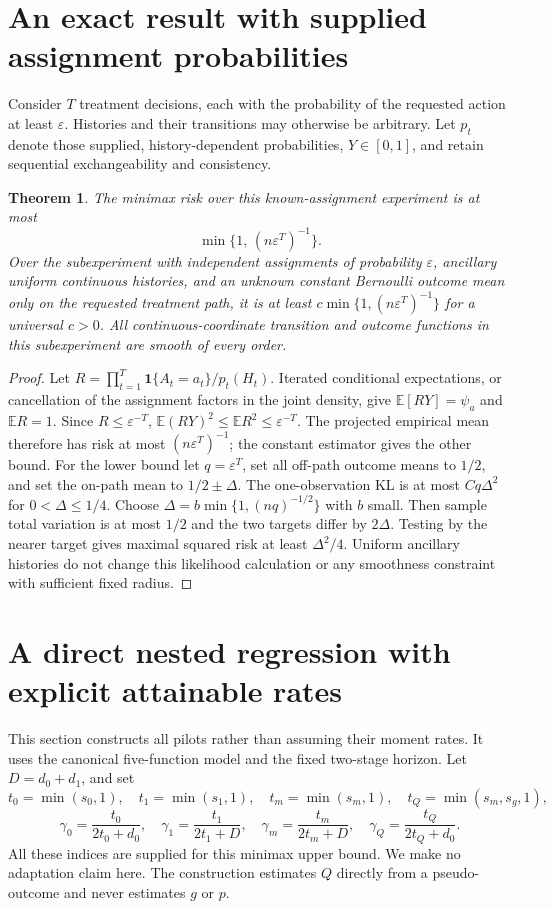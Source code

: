 \documentclass[11pt]{article}
\newtheorem{theorem}{Theorem}
\theoremstyle{definition}
\begin{document}
\section*{An exact result with supplied assignment probabilities}
Consider $T$ treatment decisions, each with the probability of the requested
action at least $\varepsilon$. Histories and their transitions may otherwise
be arbitrary. Let $p_t$ denote those supplied, history-dependent probabilities,
$Y\in[0,1]$, and retain sequential exchangeability and consistency.
\begin{theorem}
The minimax risk over this known-assignment experiment is at most
\[
 \min\{1,\,(n\varepsilon^T)^{-1}\}.
\]
Over the subexperiment with independent assignments of probability
$\varepsilon$, ancillary uniform continuous histories, and an unknown
constant Bernoulli outcome mean only on the requested treatment path,
it is at least
$c\min\{1,(n\varepsilon^T)^{-1}\}$ for a universal $c>0$.
All continuous-coordinate transition and outcome functions in this
subexperiment are smooth of every order.
\end{theorem}
\begin{proof}
Let $R=\prod_{t=1}^T\mathbf1\{A_t=a_t\}/p_t(H_t)$.
Iterated conditional expectations, or cancellation of the assignment
factors in the joint density, give $\mathbb E[RY]=\psi_a$ and
$\mathbb E R=1$. Since $R\le\varepsilon^{-T}$,
$\mathbb E(RY)^2\le\mathbb E R^2\le\varepsilon^{-T}$.
The projected empirical mean therefore has risk at most
$(n\varepsilon^T)^{-1}$; the constant estimator gives the other bound.
For the lower bound let $q=\varepsilon^T$, set all off-path outcome means
to $1/2$, and set the on-path mean to $1/2\pm\Delta$.
The one-observation KL is at most $Cq\Delta^2$ for
$0<\Delta\le1/4$. Choose
$\Delta=b\min\{1,(nq)^{-1/2}\}$ with $b$ small. Then sample total
variation is at most $1/2$ and the two targets differ by $2\Delta$.
Testing by the nearer target gives maximal squared risk at least
$\Delta^2/4$. Uniform ancillary histories do not change this likelihood
calculation or any smoothness constraint with sufficient fixed radius.
\end{proof}

\section*{A direct nested regression with explicit attainable rates}
This section constructs all pilots rather than assuming their moment
rates. It uses the canonical five-function model and the fixed two-stage
horizon. Let $D=d_0+d_1$, and set
\[
 t_0=\min(s_0,1),\quad t_1=\min(s_1,1),\quad
 t_m=\min(s_m,1),\quad t_Q=\min(s_m,s_g,1),
\]
\[
 \gamma_0=\frac{t_0}{2t_0+d_0},\quad
 \gamma_1=\frac{t_1}{2t_1+D},\quad
 \gamma_m=\frac{t_m}{2t_m+D},\quad
 \gamma_Q=\frac{t_Q}{2t_Q+d_0}.                            \tag{6}
\]
All these indices are supplied for this minimax upper bound. We make no
adaptation claim here. The construction estimates $Q$ directly from a
pseudo-outcome and never estimates $g$ or $p$.
\end{document}
